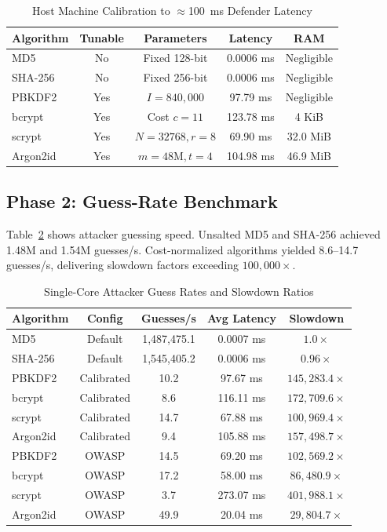 \documentclass[conference]{IEEEtran}
\begin{document}
\begin{table}[htbp]
\caption{Host Machine Calibration to $\approx$100~ms Defender Latency}
\begin{center}
\begin{tabular}{lcccc}
\toprule
\textbf{Algorithm} & \textbf{Tunable} & \textbf{Parameters} & \textbf{Latency} & \textbf{RAM} \\
\midrule
MD5 & No & Fixed 128-bit & 0.0006 ms & Negligible \\
SHA-256 & No & Fixed 256-bit & 0.0006 ms & Negligible \\
PBKDF2 & Yes & $I=840,000$ & 97.79 ms & Negligible \\
bcrypt & Yes & Cost $c=11$ & 123.78 ms & 4 KiB \\
scrypt & Yes & $N=32768, r=8$ & 69.90 ms & 32.0 MiB \\
Argon2id & Yes & $m=48\text{M}, t=4$ & 104.98 ms & 46.9 MiB \\
\bottomrule
\end{tabular}
\label{tab:cal}
\end{center}
\end{table}

\subsection{Phase 2: Guess-Rate Benchmark}
Table~\ref{tab:bench} shows attacker guessing speed. Unsalted MD5 and SHA-256 achieved 1.48M and 1.54M guesses/s. Cost-normalized algorithms yielded 8.6--14.7 guesses/s, delivering slowdown factors exceeding $100,000\times$.

\begin{table}[htbp]
\caption{Single-Core Attacker Guess Rates and Slowdown Ratios}
\begin{center}
\begin{tabular}{lcccc}
\toprule
\textbf{Algorithm} & \textbf{Config} & \textbf{Guesses/s} & \textbf{Avg Latency} & \textbf{Slowdown} \\
\midrule
MD5 & Default & 1,487,475.1 & 0.0007 ms & $1.0\times$ \\
SHA-256 & Default & 1,545,405.2 & 0.0006 ms & $0.96\times$ \\
PBKDF2 & Calibrated & 10.2 & 97.67 ms & $145,283.4\times$ \\
bcrypt & Calibrated & 8.6 & 116.11 ms & $172,709.6\times$ \\
scrypt & Calibrated & 14.7 & 67.88 ms & $100,969.4\times$ \\
Argon2id & Calibrated & 9.4 & 105.88 ms & $157,498.7\times$ \\
PBKDF2 & OWASP & 14.5 & 69.20 ms & $102,569.2\times$ \\
bcrypt & OWASP & 17.2 & 58.00 ms & $86,480.9\times$ \\
scrypt & OWASP & 3.7 & 273.07 ms & $401,988.1\times$ \\
Argon2id & OWASP & 49.9 & 20.04 ms & $29,804.7\times$ \\
\bottomrule
\end{tabular}
\label{tab:bench}
\end{center}
\end{table}
\end{document}

